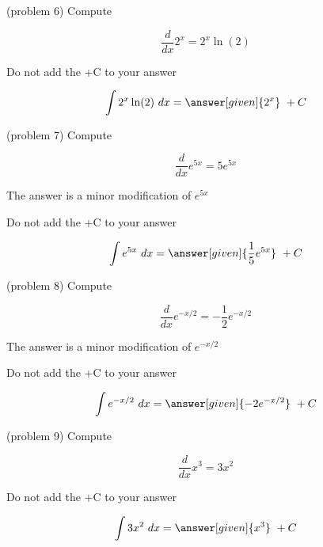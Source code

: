\documentclass{ximera}
\begin{document}
\begin{problem}(problem 6)
Compute 

\begin{hint}
\[
\frac{d}{dx} 2^x = 2^x \ln(2)
\]
\end{hint}
\begin{hint}
\begin{center}
Do not add the +C to your answer
\end{center}
\end{hint}

\[
\int 2^x \ln(2) \ dx =
\answer[given]{2^x} \ + C
\]
\end{problem}

\begin{problem}(problem 7)
Compute 

\begin{hint}
\[
\frac{d}{dx} e^{5x} = 5e^{5x}
\]
\end{hint}
\begin{hint}
The answer is a minor modification of $e^{5x}$
\end{hint}
\begin{hint}
\begin{center}
Do not add the +C to your answer
\end{center}
\end{hint}

\[
\int e^{5x} \ dx =
\answer[given]{\frac15 e^{5x}} \ + C
\]
\end{problem}

\begin{problem}(problem 8)
Compute 

\begin{hint}
\[
\frac{d}{dx} e^{-x/2} = -\frac12 e^{-x/2}
\]
\end{hint}
\begin{hint}
The answer is a minor modification of $e^{-x/2}$
\end{hint}
\begin{hint}
\begin{center}
Do not add the +C to your answer
\end{center}
\end{hint}

\[
\int e^{-x/2} \ dx =
\answer[given]{-2 e^{-x/2}} \ + C
\]
\end{problem}



\begin{problem}(problem 9)
Compute 

\begin{hint}
\[
\frac{d}{dx} x^3 = 3x^2
\]
\end{hint}
\begin{hint}
\begin{center}
Do not add the +C to your answer
\end{center}
\end{hint}

\[
\int 3x^2 \ dx =
\answer[given]{x^3} \ + C
\]
\end{problem}
\end{document}
